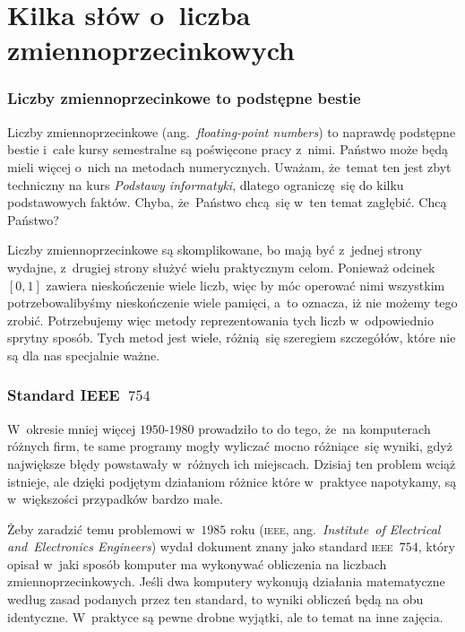 \documentclass[10pt,t]{beamer}
\begin{document}
\section{Kilka słów o~liczba zmiennoprzecinkowych}


\begin{frame}
  \frametitle{Liczby zmiennoprzecinkowe to podstępne bestie}


  Liczby zmiennoprzecinkowe (ang.~\textit{floating-point numbers}) to
  naprawdę podstępne bestie i~całe kursy semestralne są poświęcone
  pracy z~nimi. Państwo może będą mieli więcej o~nich na metodach
  numerycznych. Uważam, że~temat ten jest zbyt techniczny na kurs
  \textit{Podstawy informatyki}, dlatego ograniczę~się do kilku podstawowych
  faktów. Chyba, że~Państwo chcą~się w~ten temat zagłębić. Chcą Państwo?

  Liczby zmiennoprzecinkowe są skomplikowane, bo mają być z~jednej strony
  wydajne, z~drugiej strony służyć wielu praktycznym celom. Ponieważ
  odcinek $[ 0, 1 ]$ zawiera nieskończenie wiele liczb, więc by móc operować
  nimi wszystkim potrzebowalibyśmy nieskończenie wiele pamięci, a~to oznacza,
  iż nie możemy tego zrobić. Potrzebujemy więc metody reprezentowania tych
  liczb w~odpowiednio sprytny sposób. Tych metod jest wiele, różnią~się
  szeregiem szczegółów, które nie są dla nas specjalnie ważne.

\end{frame}





\begin{frame}
  \frametitle{Standard IEEE~$754$}


  W~okresie mniej więcej $1950\text{-}1980$ prowadziło to do tego,
  że~na komputerach różnych firm, te same programy mogły wyliczać mocno
  różniące~się wyniki, gdyż największe błędy powstawały w~różnych ich
  miejscach. Dzisiaj ten problem wciąż istnieje, ale dzięki podjętym
  działaniom różnice które w~praktyce napotykamy, są w~większości przypadków
  bardzo małe.

  Żeby zaradzić temu problemowi w~$1985$ roku
   (\textsc{ieee}, ang.~\textit{Institute~of Electrical
    and~Electronics Engineers}) wydał dokument znany jako standard
  \textsc{ieee}~$754$, który opisał w~jaki sposób komputer ma wykonywać
  obliczenia na liczbach zmiennoprzecinkowych. Jeśli dwa komputery wykonują
  działania matematyczne według zasad podanych przez ten standard, to wyniki
  obliczeń będą na obu identyczne. W~praktyce są pewne drobne wyjątki,
  ale to temat na inne zajęcia.

\end{frame}
\end{document}

